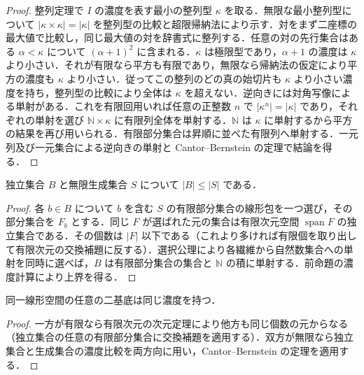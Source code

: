 \begin{proof}
整列定理で $I$ の濃度を表す最小の整列型 $\kappa$ を取る．無限な最小整列型について $|\kappa\times\kappa|=|\kappa|$ を整列型の比較と超限帰納法により示す．対をまず二座標の最大値で比較し，同じ最大値の対を辞書式に整列する．任意の対の先行集合はある $\alpha<\kappa$ について $(\alpha+1)^2$ に含まれる．$\kappa$ は極限型であり，$\alpha+1$ の濃度は $\kappa$ より小さい．それが有限なら平方も有限であり，無限なら帰納法の仮定により平方の濃度も $\kappa$ より小さい．従ってこの整列のどの真の始切片も $\kappa$ より小さい濃度を持ち，整列型の比較により全体は $\kappa$ を超えない．逆向きには対角写像による単射がある．これを有限回用いれば任意の正整数 $n$ で $|\kappa^n|=|\kappa|$ であり，それぞれの単射を選び $\mathbb N\times\kappa$ に有限列全体を単射する．$\mathbb N$ は $\kappa$ に単射するから平方の結果を再び用いられる．有限部分集合は昇順に並べた有限列へ単射する．一元列及び一元集合による逆向きの単射と Cantor–Bernstein の定理で結論を得る．
\end{proof}
\begin{prop}[独立集合と生成集合の濃度比較]
独立集合 $B$ と無限生成集合 $S$ について $|B|\leq |S|$ である．
\end{prop}
\begin{proof}
各 $b\in B$ について $b$ を含む $S$ の有限部分集合の線形包を一つ選び，その部分集合を $F_b$ とする．同じ $F$ が選ばれた元の集合は有限次元空間 $\operatorname{span}F$ の独立集合である．その個数は $|F|$ 以下である（これより多ければ有限個を取り出して有限次元の交換補題に反する）．選択公理により各繊維から自然数集合への単射を同時に選べば，$B$ は有限部分集合の集合と $\mathbb N$ の積に単射する．前命題の濃度計算により上界を得る．
\end{proof}
\begin{prop}[基底の濃度の不変性]
同一線形空間の任意の二基底は同じ濃度を持つ．
\end{prop}
\begin{proof}
一方が有限なら有限次元の次元定理により他方も同じ個数の元からなる（独立集合の任意の有限部分集合に交換補題を適用する）．双方が無限なら独立集合と生成集合の濃度比較を両方向に用い，Cantor–Bernstein の定理を適用する．
\end{proof}
